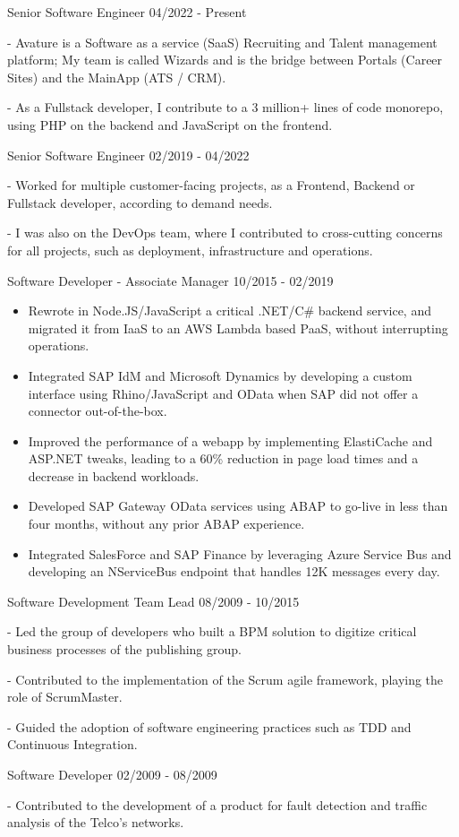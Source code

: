 \documentclass[11pt]{article} %
\begin{document}
\begin{description}
\squish
{}
           {Senior Software Engineer}
           {04/2022 - Present}

- Avature is a Software as a service (SaaS) Recruiting and Talent management platform; My team is called Wizards and is the bridge between Portals (Career Sites) and the MainApp (ATS / CRM).

- As a Fullstack developer, I contribute to a 3 million+ lines of code monorepo, using PHP on the backend and JavaScript on the frontend.

           {Senior Software Engineer}
           {02/2019 - 04/2022}

- Worked for multiple customer-facing projects, as a Frontend, Backend or Fullstack developer, according to demand needs.

- I was also on the DevOps team, where I contributed to cross-cutting concerns for all projects, such as deployment, infrastructure and operations.

           {Software Developer - Associate Manager}
           {10/2015 - 02/2019}

\begin{itemize}
\item Rewrote in Node.JS/JavaScript a critical .NET/C\# backend service, and migrated it from IaaS to an AWS Lambda based PaaS, without interrupting operations.
\item Integrated SAP IdM and Microsoft Dynamics by developing a custom interface using Rhino/JavaScript and OData when SAP did not offer a connector out-of-the-box.
\item Improved the performance of a webapp by implementing ElastiCache and ASP.NET tweaks, leading to a 60\% reduction in page load times and a decrease in backend workloads.
\item Developed SAP Gateway OData services using ABAP to go-live in less than four months, without any prior ABAP experience.
\item Integrated SalesForce and SAP Finance by leveraging Azure Service Bus and developing an NServiceBus endpoint that handles 12K messages every day.
\end{itemize}

           {Software Development Team Lead}
           {08/2009 - 10/2015}

- Led the group of developers who built a BPM solution to digitize critical business processes of the publishing group.

- Contributed to the implementation of the Scrum agile framework, playing the role of ScrumMaster.

- Guided the adoption of software engineering practices such as TDD and Continuous Integration.

           {Software Developer}
           {02/2009 - 08/2009}

- Contributed to the development of a product for fault detection and traffic analysis of the Telco's networks.

\end{description}
\end{document}
